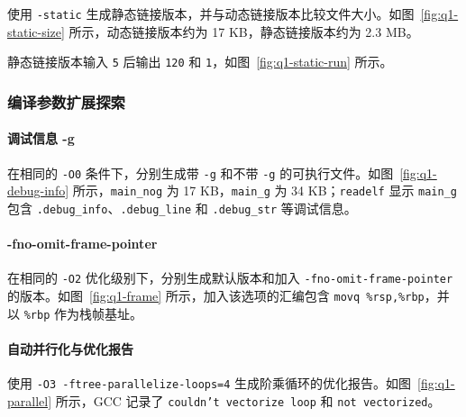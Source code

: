 
使用 \texttt{-static} 生成静态链接版本，并与动态链接版本比较文件大小。如图~\ref{fig:q1-static-size} 所示，动态链接版本约为 17 KB，静态链接版本约为 2.3 MB。


静态链接版本输入 \texttt{5} 后输出 \texttt{120} 和 \texttt{1}，如图~\ref{fig:q1-static-run} 所示。



\subsubsection{编译参数扩展探索}

\paragraph{调试信息 -g}

在相同的 \texttt{-O0} 条件下，分别生成带 \texttt{-g} 和不带 \texttt{-g} 的可执行文件。如图~\ref{fig:q1-debug-info} 所示，\texttt{main\_nog} 为 17 KB，\texttt{main\_g} 为 34 KB；\texttt{readelf} 显示 \texttt{main\_g} 包含 \texttt{.debug\_info}、\texttt{.debug\_line} 和 \texttt{.debug\_str} 等调试信息。



\paragraph{-fno-omit-frame-pointer}

在相同的 \texttt{-O2} 优化级别下，分别生成默认版本和加入 \texttt{-fno-omit-frame-pointer} 的版本。如图~\ref{fig:q1-frame} 所示，加入该选项的汇编包含 \texttt{movq \%rsp,\%rbp}，并以 \texttt{\%rbp} 作为栈帧基址。



\paragraph{自动并行化与优化报告}

使用 \texttt{-O3 -ftree-parallelize-loops=4} 生成阶乘循环的优化报告。如图~\ref{fig:q1-parallel} 所示，GCC 记录了 \texttt{couldn't vectorize loop} 和 \texttt{not vectorized}。

